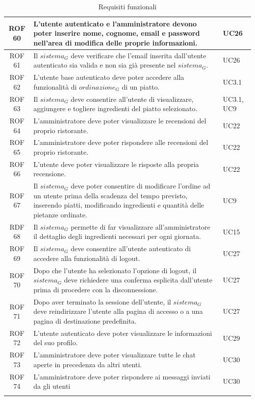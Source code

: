 \documentclass[12pt, oneside]{article}
\begin{document}
\begin{longtable}{|c|p{14cm}|p{2cm}|}
    ROF 60 & L'utente autenticato e l'amministratore devono poter inserire nome, cognome, email e password nell'area di modifica delle proprie informazioni.  & UC26  \\
    \hline
    ROF 61 & Il $\textit{sistema}_G$ deve verificare che l'email inserita dall'utente autenticato sia valida e non sia già presente nel $\textit{sistema}_G$.  & UC26  \\
    \hline
    ROF 62 & L'utente base autenticato deve poter accedere alla funzionalità di $\textit{ordinazione}_G$ di un piatto.  & UC3.1  \\
    \hline
    ROF 63 & Il $\textit{sistema}_G$ deve consentire all'utente di visualizzare, aggiungere e togliere ingredienti del piatto selezionato.  & UC3.1, UC9  \\
    \hline
    ROF 64 & L'amministratore deve poter visualizzare le recensioni del proprio ristorante. & UC22 \\ 
    \hline
    ROF 65 & L'amministratore deve poter rispondere alle recensioni del proprio ristorante. & UC22 \\
    \hline
    ROF 66 & L'utente deve poter visualizzare le risposte alla propria recensione. & UC22 \\
    \hline
    ROF 67 & Il $\textit{sistema}_G$ deve poter consentire di modificare l'ordine ad un utente prima della scadenza del tempo previsto, inserendo piatti, modificando ingredienti e quantità delle pietanze ordinate. & UC9 \\
    \hline
    RDF 68 & Il $\textit{sistema}_G$ permette di far visualizzare all'amministratore il dettaglio degli ingredienti necessari per ogni giornata. & UC15 \\
    \hline
    ROF 69 & Il $\textit{sistema}_G$ deve consentire all'utente autenticato di accedere alla funzionalità di logout. & UC27 \\
    \hline
    ROF 70 & Dopo che l'utente ha selezionato l'opzione di logout, il $\textit{sistema}_G$ deve richiedere una conferma esplicita dall'utente prima di procedere con la disconnessione. & UC27 \\ 
    \hline
    ROF 71 & Dopo aver terminato la sessione dell'utente, il $\textit{sistema}_G$ deve reindirizzare l'utente alla pagina di accesso o a una pagina di destinazione predefinita. & UC27 \\
    \hline
    ROF 72 & L'utente autenticato deve poter visualizzare le informazioni del suo profilo. & UC29 \\ 
    \hline

    ROF 73 & L'amministratore deve poter visualizzare tutte le chat aperte in precedenza da altri utenti. & UC30 \\
    \hline
    ROF 74 & L'amministratore deve poter rispondere ai messaggi inviati da gli utenti & UC30 \\
    \hline
\caption{Requisiti funzionali}
\end{longtable}
\end{document}
